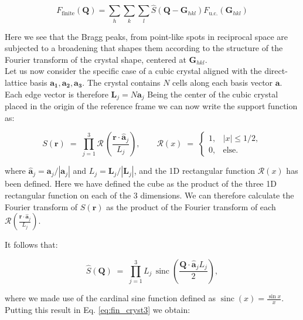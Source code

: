 \begin{equation}
    F_{\text{finite}}(\mathbf{Q}) = 
    \sum_{h} \sum_{k} \sum_{l} \widehat S(\mathbf Q - \mathbf{G}_{hkl})F_{\text{u.c.}}(\mathbf{G}_{hkl})
    \label{eq:fin_cryst3}
\end{equation}

Here we see that the Bragg peaks, from point-like spots in reciprocal space are subjected to a broadening that shapes them 
according to the structure of the Fourier transform of the crystal shape, centered at $\mathbf{G}_{hkl}$. \\

Let us now consider the specific case of a cubic crystal aligned with the direct-lattice basis $\mathbf{a_1},\mathbf{a_2},\mathbf{a_3}$.
The crystal contains $N$ cells along each basis vector $\mathbf{a}$. Each edge vector is therefore $\mathbf{L}_j = N\mathbf{a}_j$ 
Being the center of the cubic crystal placed in the origin of the reference frame we can now write the support function as: 

\begin{equation}
    S(\mathbf r) \;=\; 
    \prod_{j=1}^{3} \mathcal R \,\!\left(\frac{\mathbf{r} \cdot \mathbf{\hat{a}}_j}{L_j}\right),
    \qquad
    \mathcal R(x) \;=\;
    \begin{cases}
    1, & |x| \le 1/2
    , \\[6pt]
    0, & \text{else}.
    \end{cases}
    \label{eq:cube}
\end{equation}

where $\mathbf{\hat{a}}_j = \mathbf{a}_j/|\mathbf{a}_j|$ and $L_j = \mathbf{L}_j/|\mathbf{L}_j|$, and the 1D rectangular function
$ \mathcal R(x)$ has been defined. Here we have defined the cube as the product of the three 1D rectangular function on each 
of the 3 dimensions. We can therefore calculate the Fourier transform of $S(\mathbf{r})$ as the product of the Fourier 
transform of each $\mathcal{R}\left(\frac{\mathbf{r} \cdot \mathbf{\hat{a}}_j}{L_j}\right)$. 

It follows that: 

\begin{equation}
    \widehat S(\mathbf Q) \;=\; 
    \prod_{j=1}^{3} L_j \,\!\operatorname{sinc}\left(\frac{\mathbf{Q} \cdot \mathbf{\hat{a}}_j L_j}{2}\right),
\end{equation}

where we made use of the cardinal sine function defined as $\operatorname{sinc}(x) = \frac{\sin x}{x}$. 
Putting this result in Eq. \ref{eq:fin_cryst3} we obtain: 


